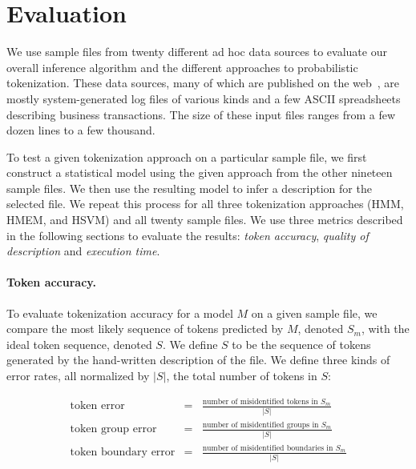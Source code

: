 \section{Evaluation}\label{sec:eval}
We use sample files from twenty different ad hoc data sources to
evaluate our overall inference algorithm and the different
approaches to probabilistic tokenization.
These data sources, many of which are published on the
web~\cite{padsweb}, are mostly system-generated log files of various
kinds and a few ASCII spreadsheets describing business transactions.
The size of these input files ranges from a few dozen lines to a few
thousand.

To test a given tokenization approach on a particular sample file, we
first construct a statistical model using the given approach from the
other nineteen sample files.  We then use the resulting model to infer a
description for the selected file.  We repeat this process for all
three tokenization approaches (HMM, HMEM, and HSVM) and all twenty
sample files.  We use three metrics described in the following
sections to evaluate the results: {\em token accuracy},
{\em quality of description} and {\em execution time}.

\paragraph*{Token accuracy.}
To evaluate tokenization accuracy for a model $M$ on a given sample
file, we compare the most likely sequence of tokens predicted by $M$,
denoted $S_m$, with the ideal token sequence, denoted $S$.  We define
$S$ to be the sequence of tokens generated by the hand-written \pads{}
description of the file.  We define three kinds of error rates, all
normalized by $|S|$, the total number of tokens in $S$:

\begin{eqnarray*}
\textrm{token error} & = & \frac{\textrm{number of misidentified tokens in $S_m$}}
    {|S|} \\[1ex]
\textrm{token group error} & = & \frac{\textrm{number of misidentified groups in $S_m$}}
    {|S|}\\[1ex]
\textrm{token boundary error} & = & \frac{\textrm{number of misidentified boundaries in $S_m$}}
    {|S|}
\end{eqnarray*}

